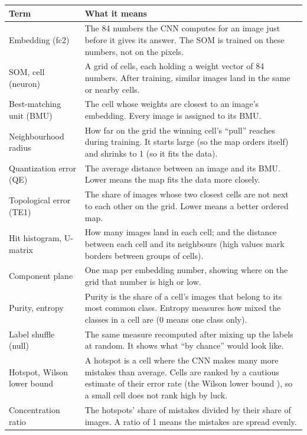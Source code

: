 \documentclass[11pt]{article}
\begin{document}
{\small
\renewcommand{\arraystretch}{1.12}
\begin{tabularx}{\textwidth}{|>{\raggedright\arraybackslash}p{}|X|}
\hline
\textbf{Term} & \textbf{What it means} \\ \hline
Embedding (fc2) & The 84 numbers the CNN computes for an image just before it gives its answer. The SOM is trained on these numbers, not on the pixels. \\ \hline
SOM, cell (neuron) & A grid of cells, each holding a weight vector of 84 numbers. After training, similar images land in the same or nearby cells. \\ \hline
Best-matching unit (BMU) & The cell whose weights are closest to an image's embedding. Every image is assigned to its BMU. \\ \hline
Neighbourhood radius & How far on the grid the winning cell's ``pull'' reaches during training. It starts large (so the map orders itself) and shrinks to 1 (so it fits the data). \\ \hline
Quantization error (QE) & The average distance between an image and its BMU. Lower means the map fits the data more closely. \\ \hline
Topological error (TE1) & The share of images whose two closest cells are not next to each other on the grid. Lower means a better ordered map. \\ \hline
Hit histogram, U-matrix & How many images land in each cell; and the distance between each cell and its neighbours (high values mark borders between groups of cells). \\ \hline
Component plane & One map per embedding number, showing where on the grid that number is high or low. \\ \hline
Purity, entropy & Purity is the share of a cell's images that belong to its most common class. Entropy measures how mixed the classes in a cell are (0 means one class only). \\ \hline
Label shuffle (null) & The same measure recomputed after mixing up the labels at random. It shows what ``by chance'' would look like. \\ \hline
Hotspot, Wilson lower bound & A hotspot is a cell where the CNN makes many more mistakes than average. Cells are ranked by a cautious estimate of their error rate (the Wilson lower bound \cite{wilson1927probable}), so a small cell does not rank high by luck. \\ \hline
Concentration ratio & The hotspots' share of mistakes divided by their share of images. A ratio of 1 means the mistakes are spread evenly. \\ \hline
\end{tabularx}}
\end{document}
